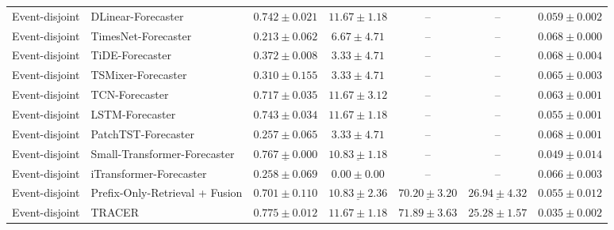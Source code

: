 \begin{table}[t]
{\begin{tabular}{llccccc}
\midrule
Event-disjoint & DLinear-Forecaster & $0.742 \pm 0.021$ & $\mathbf{11.67 \pm 1.18}$ & -- & -- & $0.059 \pm 0.002$ \\
Event-disjoint & TimesNet-Forecaster & $0.213 \pm 0.062$ & $6.67 \pm 4.71$ & -- & -- & $0.068 \pm 0.000$ \\
Event-disjoint & TiDE-Forecaster & $0.372 \pm 0.008$ & $3.33 \pm 4.71$ & -- & -- & $0.068 \pm 0.004$ \\
Event-disjoint & TSMixer-Forecaster & $0.310 \pm 0.155$ & $3.33 \pm 4.71$ & -- & -- & $0.065 \pm 0.003$ \\
Event-disjoint & TCN-Forecaster & $0.717 \pm 0.035$ & $\mathbf{11.67 \pm 3.12}$ & -- & -- & $0.063 \pm 0.001$ \\
Event-disjoint & LSTM-Forecaster & $0.743 \pm 0.034$ & $\mathbf{11.67 \pm 1.18}$ & -- & -- & $0.055 \pm 0.001$ \\
Event-disjoint & PatchTST-Forecaster & $0.257 \pm 0.065$ & $3.33 \pm 4.71$ & -- & -- & $0.068 \pm 0.001$ \\
Event-disjoint & Small-Transformer-Forecaster & $\underline{0.767 \pm 0.000}$ & $\underline{10.83 \pm 1.18}$ & -- & -- & $\underline{0.049 \pm 0.014}$ \\
Event-disjoint & iTransformer-Forecaster & $0.258 \pm 0.069$ & $0.00 \pm 0.00$ & -- & -- & $0.066 \pm 0.003$ \\
Event-disjoint & Prefix-Only-Retrieval + Fusion & $0.701 \pm 0.110$ & $\underline{10.83 \pm 2.36}$ & $\underline{70.20 \pm 3.20}$ & $\underline{26.94 \pm 4.32}$ & $0.055 \pm 0.012$ \\
Event-disjoint & TRACER & $\mathbf{0.775 \pm 0.012}$ & $\mathbf{11.67 \pm 1.18}$ & $\mathbf{71.89 \pm 3.63}$ & $\mathbf{25.28 \pm 1.57}$ & $\mathbf{0.035 \pm 0.002}$ \\
\bottomrule
\end{tabular}
}
\end{table}
